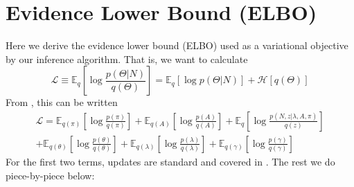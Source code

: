 \section{Evidence Lower Bound (ELBO)}
Here we derive the evidence lower bound (ELBO) used as a variational objective by our inference algorithm. That is, we want to calculate
\begin{equation}
    \mathcal{L} \equiv \mathbb{E}_q \left[\log \frac{p(\Theta|N)}{q(\Theta)} \right] = \mathbb{E}_q \left[\log p(\Theta|N) \right] + \mathcal{H}[q(\Theta)]
\end{equation}
From \cite{beal2003variational}, this can be written
\begin{multline}
    \mathcal{L} = \mathbb{E}_{q(\pi)} \left[\log \frac{p(\pi)}{q(\pi)} \right]
    + \mathbb{E}_{q(A)} \left[\log \frac{p(A)}{q(A)} \right]
    + \mathbb{E}_{q}\left[ \log \frac{p(N, z|\lambda, A, \pi)}{q(z)}\right] \\
    + \mathbb{E}_{q(\theta)} \left[\log \frac{p(\theta)}{q(\theta)} \right]
    + \mathbb{E}_{q(\lambda)} \left[\log \frac{p(\lambda)}{q(\lambda)} \right]
    + \mathbb{E}_{q(\gamma)} \left[\log \frac{p(\gamma)}{q(\gamma)} \right]
\end{multline}
For the first two terms, updates are standard and covered in \cite{beal2003variational}. The rest we do piece-by-piece below:

